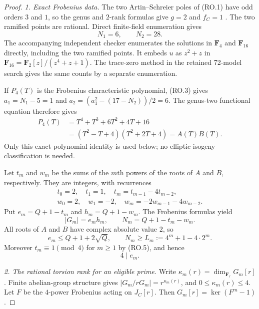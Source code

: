 \documentclass[11pt,a4paper]{article}
\begin{document}
\begin{proof}
\emph{1. Exact Frobenius data.}
The two Artin--Schreier poles of (RO.1) have odd orders
$3$ and $1$, so the genus and $2$-rank formulas give
$g=2$ and $f_C=1$ \cite[Lemma~2.6]{PriesZhu2012}.
The two ramified points are rational.
Direct finite-field enumeration gives
\[
                 N_1=6,\qquad N_2=28.
\tag{RO.3}
\]
The accompanying independent checker enumerates the
solutions in $\mathbf F_4$ and $\mathbf F_{16}$ directly,
including the two ramified points.  It embeds $u$ as
$z^2+z$ in $\mathbf F_{16}=\mathbf F_2[z]/(z^4+z+1)$.
The trace-zero method in the retained 72-model search
gives the same counts by a separate enumeration.

If $P_4(T)$ is the Frobenius characteristic polynomial,
(RO.3) gives $a_1=N_1-5=1$ and
$a_2=(a_1^2-(17-N_2))/2=6$.
The genus-two functional equation therefore gives
\[
 \begin{aligned}
 P_4(T)&=T^4+T^3+6T^2+4T+16\\
       &=(T^2-T+4)(T^2+2T+4)=A(T)B(T).
 \end{aligned}
\tag{RO.4}
\]
Only this exact polynomial identity is used below;
no elliptic isogeny classification is needed.

Let $t_m$ and $w_m$ be the sums of the $m$th powers of
the roots of $A$ and $B$, respectively.  They are integers,
with recurrences
\[
\begin{gathered}
 t_0=2,\quad t_1=1,\quad t_m=t_{m-1}-4t_{m-2},\\
 w_0=2,\quad w_1=-2,\quad w_m=-2w_{m-1}-4w_{m-2}.
\end{gathered}
\tag{RO.5}
\]
Put $e_m=Q+1-t_m$ and $h_m=Q+1-w_m$.
The Frobenius formulas \cite[Theorem~19.1(b)]{MilneAV} yield
\[
             |G_m|=e_mh_m,\qquad N_m=Q+1-t_m-w_m.
\tag{RO.6}
\]
All roots of $A$ and $B$ have complex absolute value $2$,
so
\[
 e_m\le Q+1+2\sqrt Q,
 \qquad N_m\ge L_m:=4^m+1-4\cdot2^m.
\tag{RO.7}
\]
Moreover $t_m\equiv1\pmod4$ for $m\ge1$ by (RO.5),
and hence
\[
                               4\mid e_m.
\tag{RO.8}
\]

\emph{2. The rational torsion rank for an eligible prime.}
Write $\kappa_m(r)=\dim_{\mathbf F_r}G_m[r]$.
Finite abelian-group structure gives
$|G_m/rG_m|=r^{\kappa_m(r)}$, and
$0\le\kappa_m(r)\le4$.
Let $F$ be the $4$-power Frobenius acting on $J_C[r]$.
Then $G_m[r]=\ker(F^m-1)$.


\end{proof}
\end{document}

